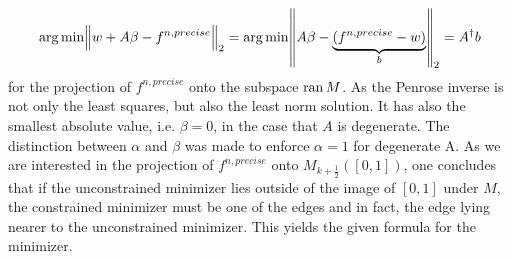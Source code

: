 \[
	\operatorname*{arg\,min} \norm{w + A\beta - f^{n, precise}}_2 = \operatorname*{arg\,min} \norm{A\beta - \underbrace{(f^{n, precise} - w)}_{b}}_2 = A^\dagger b
\]
for the projection of $f^{n, precise}$ onto the subspace $\operatorname{ran}{M}$.
As the Penrose inverse is not only the least squares, but also the least norm solution. It has also the smallest absolute value, i.e. $\beta = 0$, in the case that $A$ is degenerate. The distinction between $\alpha$ and $\beta$ was made to enforce $\alpha = 1$ for degenerate A. As we are interested in the projection of $f^{n, precise}$ onto $M_{k+\frac 1 2}([0, 1])$, one concludes that if the unconstrained minimizer lies outside of the image of $[0, 1]$ under $M$, the constrained minimizer must be one of the edges and in fact, the edge lying nearer to the unconstrained minimizer. This yields the given formula for the minimizer. 




